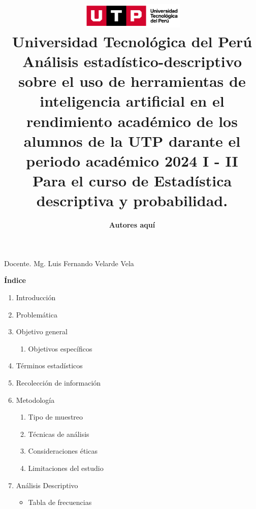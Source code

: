 \documentclass{article}
\title{
  \includegraphics[width=5cm]{./assets/logo-utp.png} \\
  \vspace{1cm}
  \textbf{Universidad Tecnológica del Perú} \\
  \vspace{2cm}
  \textbf{Análisis estadístico-descriptivo sobre el uso de herramientas de inteligencia artificial en el rendimiento académico de los alumnos de la UTP darante el periodo académico 2024 I - II} \\
  \vspace{1cm}
  \large \textbf{Para el curso de Estadística descriptiva y probabilidad.}
}
\author{
  \textbf{Autores aquí} \\
}
\newenvironment{indexPre}{}{}
\begin{document}
\maketitle

\begin{center}
  Docente. Mg. Luis Fernando Velarde Vela  
\end{center}
\restoregeometry

\newpage

\begin{indexPre}
  \begin{center}
    \textbf{\Large Índice}
  \end{center}
  \vspace{0.5cm} %
  
  \begin{spacing}{1.15} %
    \noindent
    \begin{enumerate}
      \item Introducción
      \item Problemática
      \item Objetivo general
      \begin{enumerate}
        \item Objetivos específicos
      \end{enumerate}
      \item Términos estadísticos
      \item Recolección de información
      \item Metodología
      \begin{enumerate}
        \item Tipo de muestreo
        \item Técnicas de análisis
        \item Consideraciones éticas
        \item Limitaciones del estudio
      \end{enumerate}
      \item Análisis Descriptivo
      \begin{itemize}
        \item Tabla de frecuencias
      \end{itemize}
    \end{enumerate}
  \end{spacing}

\end{indexPre}

\newpage
\end{document}
